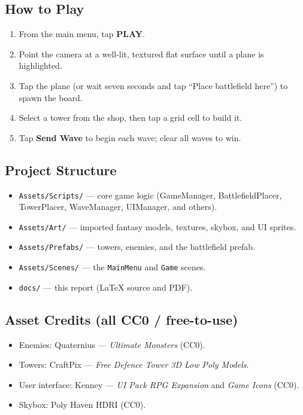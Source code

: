 \documentclass[11pt,a4paper]{article}
\begin{document}
\subsection*{How to Play}
\begin{enumerate}[nosep]
  \item From the main menu, tap \textbf{PLAY}.
  \item Point the camera at a well-lit, textured flat surface until a plane is highlighted.
  \item Tap the plane (or wait seven seconds and tap ``Place battlefield here'') to spawn the board.
  \item Select a tower from the shop, then tap a grid cell to build it.
  \item Tap \textbf{Send Wave} to begin each wave; clear all waves to win.
\end{enumerate}

\subsection*{Project Structure}
\begin{itemize}[nosep]
  \item \texttt{Assets/Scripts/} --- core game logic (GameManager, BattlefieldPlacer, TowerPlacer, WaveManager, UIManager, and others).
  \item \texttt{Assets/Art/} --- imported fantasy models, textures, skybox, and UI sprites.
  \item \texttt{Assets/Prefabs/} --- towers, enemies, and the battlefield prefab.
  \item \texttt{Assets/Scenes/} --- the \texttt{MainMenu} and \texttt{Game} scenes.
  \item \texttt{docs/} --- this report (LaTeX source and PDF).
\end{itemize}

\subsection*{Asset Credits (all CC0 / free-to-use)}
\begin{itemize}[nosep]
  \item Enemies: Quaternius --- \emph{Ultimate Monsters} (CC0).
  \item Towers: CraftPix --- \emph{Free Defence Tower 3D Low Poly Models}.
  \item User interface: Kenney --- \emph{UI Pack RPG Expansion} and \emph{Game Icons} (CC0).
  \item Skybox: Poly Haven HDRI (CC0).
\end{itemize}
\end{document}
